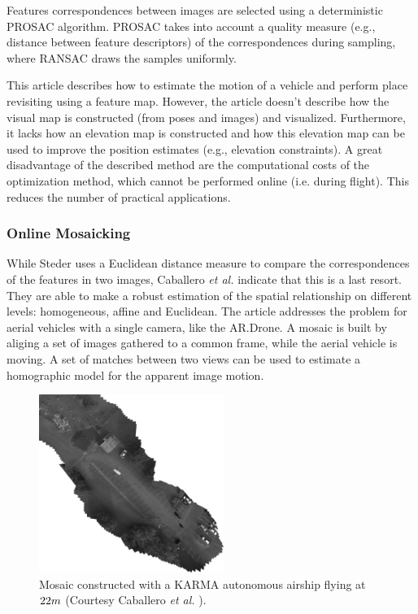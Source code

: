 Features correspondences between images are selected using a deterministic PROSAC \cite{chum2005matching} algorithm.
PROSAC takes into account a quality measure (e.g., distance between feature descriptors) of the correspondences during sampling, where RANSAC draws the samples uniformly.

This article describes how to estimate the motion of a vehicle and perform place revisiting using a feature map.
However, the article doesn't describe how the visual map is constructed (from poses and images) and visualized.
Furthermore, it lacks how an elevation map is constructed and how this elevation map can be used to improve the position estimates (e.g., elevation constraints).
A great disadvantage of the described method are the computational costs of the optimization method, which cannot be performed online (i.e. during flight). This reduces the number of practical applications.


\subsubsection{Online Mosaicking}
While Steder uses a Euclidean distance measure to compare the correspondences of the features in two images, Caballero \textit{et al.} \cite{caballero2009unmanned} indicate that this is a last resort.
They are able to make a robust estimation of the spatial relationship on different levels: homogeneous, affine and Euclidean.
The article addresses the problem for aerial vehicles with a single camera, like the AR.Drone.
A mosaic is built by aliging a set of images gathered to a common frame, while the aerial vehicle is moving.
A set of matches between two views can be used to estimate a homographic model for the apparent image motion.

\begin{figure}[htb]
\centering
\includegraphics[width=6cm]{images/Caballero_map.png}
\caption{Mosaic constructed with a KARMA autonomous airship flying at $22\small{m}$ (Courtesy Caballero \textit{et al.} \cite{caballero2009unmanned}).}
\label{fig:Caballero_map}
\end{figure}


